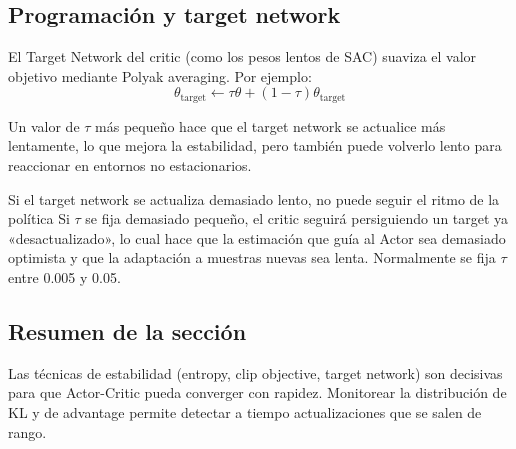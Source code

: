 \subsection{Programación y target network}

El Target Network del critic (como los pesos lentos de SAC) suaviza el valor objetivo mediante Polyak averaging. Por ejemplo:
$$\theta_{\text{target}} \leftarrow \tau \theta + (1 - \tau) \theta_{\text{target}}$$

Un valor de $\tau$ más pequeño hace que el target network se actualice más lentamente, lo que mejora la estabilidad, pero también puede volverlo lento para reaccionar en entornos no estacionarios.

\begin{warningbox}{Si el target network se actualiza demasiado lento, no puede seguir el ritmo de la política}
Si $\tau$ se fija demasiado pequeño, el critic seguirá persiguiendo un target ya «desactualizado», lo cual hace que la estimación que guía al Actor sea demasiado optimista y que la adaptación a muestras nuevas sea lenta. Normalmente se fija $\tau$ entre 0.005 y 0.05.
\end{warningbox}

\subsection{Resumen de la sección}

Las técnicas de estabilidad (entropy, clip objective, target network) son decisivas para que Actor-Critic pueda converger con rapidez. Monitorear la distribución de KL y de advantage permite detectar a tiempo actualizaciones que se salen de rango.

